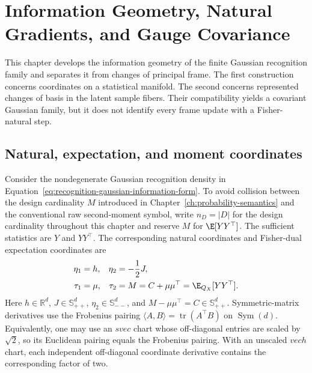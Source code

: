 \chapter{Information Geometry, Natural Gradients, and Gauge Covariance}
\label{ch:information-geometry-gauge}

This chapter develops the information geometry of the finite Gaussian recognition family and separates it from changes of principal frame. The first construction concerns coordinates on a statistical manifold. The second concerns represented changes of basis in the latent sample fibers. Their compatibility yields a covariant Gaussian family, but it does not identify every frame update with a Fisher-natural step.

\section{Natural, expectation, and moment coordinates}

Consider the nondegenerate Gaussian recognition density in Equation~\eqref{eq:recognition-gaussian-information-form}. To avoid collision between the design cardinality \(M\) introduced in Chapter~\ref{ch:probability-semantics} and the conventional raw second-moment symbol, write \(n_D=|D|\) for the design cardinality throughout this chapter and reserve \(M\) for \(\E[YY^\top]\). The sufficient statistics are \(Y\) and \(YY^\top\). The corresponding natural coordinates and Fisher-dual expectation coordinates are
\begin{align}
\eta_1&=h,
&\eta_2&=-\frac12J,
\label{eq:gaussian-natural-coordinates}\\
\tau_1&=\mu,
&\tau_2&=M=C+\mu\mu^\top=\E_{Q_X}[YY^\top].
\label{eq:gaussian-expectation-coordinates}
\end{align}
Here \(h\in\mathbb R^d\), \(J\in\mathbb S_{++}^d\), \(\eta_2\in\mathbb S_{--}^d\), and \(M-\mu\mu^\top=C\in\mathbb S_{++}^d\). Symmetric-matrix derivatives use the Frobenius pairing \(\langle A,B\rangle=\operatorname{tr}(A^\top B)\) on \(\operatorname{Sym}(d)\). Equivalently, one may use an \(svec\) chart whose off-diagonal entries are scaled by \(\sqrt2\), so its Euclidean pairing equals the Frobenius pairing. With an unscaled \(vech\) chart, each independent off-diagonal coordinate derivative contains the corresponding factor of two.

